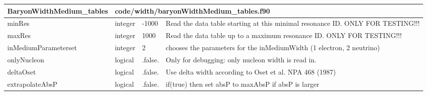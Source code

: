\documentclass{article}
\begin{document}
\begin{longtable}{llll}
\toprule
\textbf{\large{BaryonWidthMedium\_tables}} & \multicolumn{3}{l}{\footnotesize{code/width/baryonWidthMedium\_tables.f90}}\\*
\midrule
\endfirsthead
\midrule
\endhead
minRes & \begin{minipage}[t]{2cm}integer\end{minipage} & \begin{minipage}[t]{2cm}-1000\end{minipage} & \begin{minipage}[t]{12cm}Read the data table starting at this minimal resonance ID. ONLY FOR TESTING!!!\end{minipage}\\*
\midrule
maxRes & \begin{minipage}[t]{2cm}integer\end{minipage} & \begin{minipage}[t]{2cm}1000\end{minipage} & \begin{minipage}[t]{12cm}Read the data table up to a maximum resonance ID. ONLY FOR TESTING!!!\end{minipage}\\*
\midrule
inMediumParameterset & \begin{minipage}[t]{2cm}integer\end{minipage} & \begin{minipage}[t]{2cm}2\end{minipage} & \begin{minipage}[t]{12cm}chooses the parameters for the inMediumWidth (1 electron, 2 neutrino)\end{minipage}\\*
\midrule
onlyNucleon & \begin{minipage}[t]{2cm}logical\end{minipage} & \begin{minipage}[t]{2cm}.false.\end{minipage} & \begin{minipage}[t]{12cm}Only for debugging: only nucleon width is read in.\end{minipage}\\*
\midrule
deltaOset & \begin{minipage}[t]{2cm}logical\end{minipage} & \begin{minipage}[t]{2cm}.false.\end{minipage} & \begin{minipage}[t]{12cm}Use delta width according to Oset et al. NPA 468 (1987)\end{minipage}\\*
\midrule
extrapolateAbsP & \begin{minipage}[t]{2cm}logical\end{minipage} & \begin{minipage}[t]{2cm}.false.\end{minipage} & \begin{minipage}[t]{12cm}if(true) then set absP to maxAbsP if absP is larger\end{minipage}\\*
\bottomrule
\end{longtable}
\end{document}
